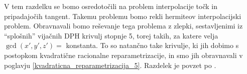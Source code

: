 \documentclass[12pt,a4paper,twoside]{article}
\theoremstyle{definition} %
\theoremstyle{plain} %
\theoremstyle{primerstyle}
\numberwithin{equation}{section}  %
\begin{document}
V tem razdelku se bomo osredotočili na problem interpolacije točk in pripadajočih tangent. Takemu problemu bomo rekli hermiteov interpolacijski problem. Obravnavali bomo reševanje tega problema z zlepki, sestavljenimi iz ``splošnih'' vijačnih DPH krivulj stopnje 5, torej takih, za katere velja $\gcd(x',y',z')=$ konstanta. To so natančno take krivulje, ki jih dobimo s postopkom kvadratične racionalne reparametrizacije, in smo jih obravnavali v poglavju \ref{kvadraticna_reparametrizacija_5}. Razdelek je povzet po \cite{faroukietal2004}.%

\end{document}
